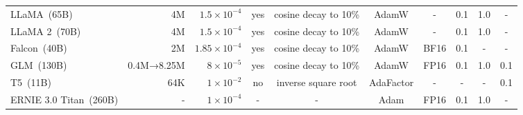 {\begin{table}[htb]
{\begin{tabular}{lrrccccccc}
LLaMA~(65B)             & 4M                                                                                & $1.5 \times 10^{-4}$                                                        & yes             & cosine decay to 10\%    & AdamW                                           & -                                                                          & 0.1                                                                                     & 1.0                                                                   & -                \\
LLaMA 2~(70B) & 4M & $1.5 \times 10^{-4}$ & yes & cosine decay to 10\% & AdamW & - & 0.1 & 1.0 & - \\
Falcon~(40B) & 2M & $1.85 \times 10^{-4}$ & yes & cosine decay to 10\% & AdamW & BF16 & 0.1 & - & - \\
GLM~(130B)              & 0.4M→8.25M                                                                        & $8 \times 10^{-5}$                                                          & yes             & cosine decay to 10\%    & AdamW                                           & FP16                                                                       & 0.1                                                                                     & 1.0                                                                   & 0.1              \\
T5~(11B)                & 64K                                                                               & $1 \times 10^{-2}$                                                          & no              & inverse square root     & AdaFactor                                       & -                                                                          & -                                                                                       & -                                                                     & 0.1              \\
ERNIE 3.0 Titan~(260B)  & -                                                                                 & $1 \times 10^{-4}$                                                          & -               & -                       & Adam                                            & FP16                                                                       & 0.1                                                                                     & 1.0                                                                   & -                \\

\end{tabular}}
\end{table}}
